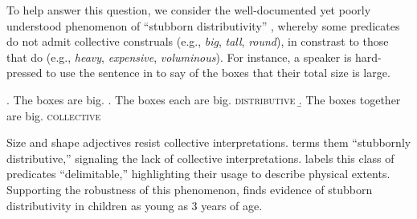 \documentclass[preprint,12pt,authoryear,titlepage]{elsarticle}
\begin{document}
To help answer this question, we consider the well-documented yet poorly understood phenomenon of ``stubborn distributivity'' \citep{quine1960,schwarzschild2011,vazquezrojas2012,zhang2013,syrett2015}, whereby some predicates do not admit collective construals (e.g., \emph{big}, \emph{tall}, \emph{round}), in constrast to those that do (e.g., \emph{heavy}, \emph{expensive}, \emph{voluminous}). 
For instance, a speaker is hard-pressed to use the sentence in \Next to say of the boxes that their total size is large.

\ex. The boxes are big.
\a. The boxes each are big. \hfill \textsc{distributive}
\b. The boxes together are big. \hfill {}\textsc{collective}

Size and shape adjectives 
resist collective interpretations. \cite{schwarzschild2011} terms them ``stubbornly distributive,'' signaling the lack of collective interpretations. \citet{zhang2013} labels this class of predicates ``delimitable,'' highlighting their usage to describe physical extents. Supporting the robustness of this phenomenon, \cite{syrett2015} finds evidence of stubborn distributivity in children as young as 3 years of age.
\end{document}
